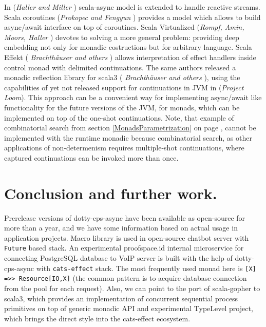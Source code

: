 \documentclass{llncs}
\begin{document}
In ({\it Haller and Miller } \cite{DBLP:journals/corr/HallerM15})  scala-async model is extended to handle reactive streams. Scala coroutines  ({\it Prokopec and Fengyun} \cite{prokopec_et_al:LIPIcs:2018:9208})  provides a model which allows to build async/await interface on top of coroutines.
  Scala Virtualized ({\it Rompf, Amin, Moors, Haller} \cite{ScalaVirtualized}) devotes to solving a more general problem: providing deep embedding not only for monadic costructions but for arbitrary language.
  Scala Effekt ({ \it Brachth{\"{a}}user and others } \cite{DBLP:journals/jfp/BrachthauserSO20})  allows interpretation of effect handlers inside control monad with delimited continuations.  The same authors released a  monadic reflection library for scala3  ({ \it Brachth{\"{a}}user and others } \cite{brachthaeuser21representing}),   using the capabilities of yet not released support for continuations in JVM in ({\it Project Loom}\cite{ProjectLoom}).  This approach can be a convenient way for implementing async/await like functionality for the future versions of the JVM,  for monads, which can be implemented on top of the one-shot continuations.  Note, that example of combinatorial search from section \ref{MonadsParametrization} on page \pageref{CombSearch},  cannot be implemented with the runtime monadic  because combinatorial search, as other applications of non-determenism requires multiple-shot continuations, where captured continuations can be invoked more than once. 
   


\section{ Conclusion and further work. } \label{Conclusion}

  Prerelease versions of dotty-cps-async have been available as open-source for more than a year, and we have some information based on actual usage in application projects.  Macro library is used in open-source chatbot server with \lstinline|Future| based stack. An experimental proofspace.id internal microservice for connecting PostgreSQL database to VoIP server is built with the help of dotty-cps-async with \lstinline|cats-effect| stack.  The most frequently used monad here is \lstinline|[X] =>> Resource[IO,X]| (the common pattern is to acquire database connection from the pool for each request).  Also, we can point to the port of scala-gopher to scala3, which provides an implementation of concurrent sequential process primitives on top of generic monadic API and experimental TypeLevel project, which brings the direct style into the cats-effect ecosystem.
\end{document}
